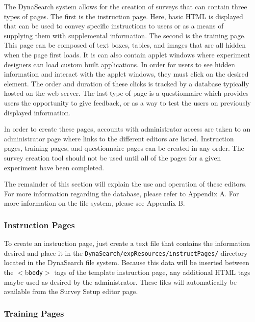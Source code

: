 \documentclass[article]{ij4uq}              %
\begin{document}
The DynaSearch system allows for the creation of surveys that can contain three types of pages. The first is the instruction page. Here, basic HTML is displayed that can be used to convey specific instructions to users or as a means of supplying them with supplemental information. The second is the training page. This page can be composed of text boxes, tables, and images that are all hidden when the page first loads. It is can also contain applet windows where experiment designers can load custom built applications.  In order for users to see hidden information and interact with the applet windows, they must click on the desired element. The order and duration of these clicks is tracked by a database typically hosted on the web server. The last type of page is a questionnaire which provides users the opportunity to give feedback, or as a way to test the users on previously displayed information.

In order to create these pages, accounts with administrator access are taken to an administrator page where links to the different editors are listed. Instruction pages, training pages, and questionnaire pages can be created in any order. The survey creation tool should not be used until all of the pages for a given experiment have been completed.

The remainder of this section will explain the use and operation of these editors. For more information regarding the database, please refer to Appendix A. For more information on the file system, please see Appendix B.

\subsubsection{Instruction Pages}
To create an instruction page, just create a text file that contains the information desired and place it in the \newline \texttt{DynaSearch/expResources/instructPages/} directory located in the DynaSearch file system. Because this data will be inserted between the $<$b\texttt{body}$>$ tags of the template instruction page, any additional HTML tags maybe used as desired by the administrator. These files will automatically be available from the Survey Setup editor page. 

\subsubsection{Training Pages}
\end{document}
